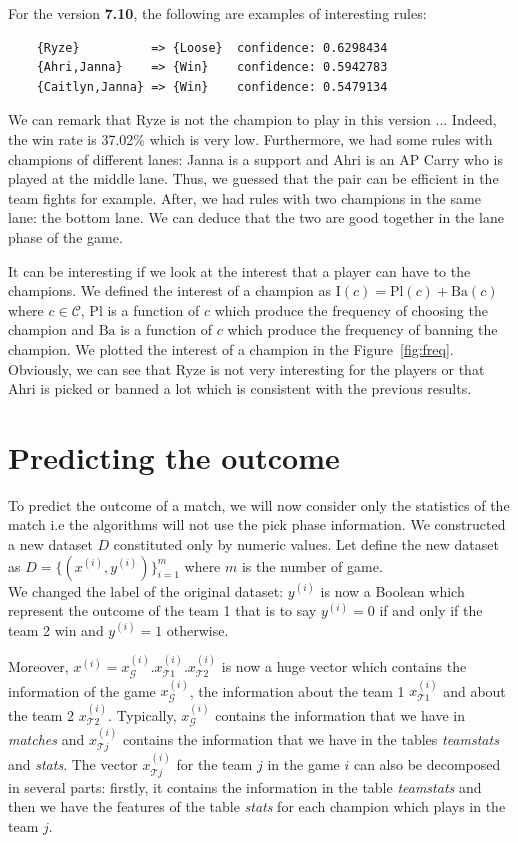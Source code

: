 \documentclass{article}
\def\version{\textbf{7.10}}
\def\champion{\mathcal{C}}
\def\interest#1{\text{I}(#1)}
\def\inTplay{\text{Pl}}
\def\inTban{\text{Ba}}
\def\database{D}
\begin{document}
For the version \version, the following are examples of interesting rules:
\begin{verbatim}
    {Ryze}          => {Loose}  confidence: 0.6298434
    {Ahri,Janna}    => {Win}    confidence: 0.5942783
    {Caitlyn,Janna} => {Win}    confidence: 0.5479134
\end{verbatim}
We can remark that Ryze is not the champion to play in this version ... Indeed, the win rate is 37.02\% which is very low.
Furthermore, we had some rules with champions of different lanes: Janna is a support and Ahri is an AP Carry who is played at the middle lane. Thus, we guessed that the pair can be efficient in the team fights for example. After, we had rules with two champions in the same lane: the bottom lane. We can deduce that the two are good together in the lane phase of the game.

It can be interesting if we look at the interest that a player can have to the champions. We defined the interest of a champion as $\interest{c}=\inTplay(c)+\inTban(c)$ where $c\in\champion$, $\inTplay$ is a function of $c$ which produce the frequency of choosing the champion and $\inTban$ is a function of $c$ which produce the frequency of banning the champion. We plotted the interest of a champion in the Figure~\ref{fig:freq}. Obviously, we can see that Ryze is not very interesting for the players or that Ahri is picked or banned a lot which is consistent with the previous results.

\section{Predicting the outcome}
To predict the outcome of a match, we will now consider only the statistics of the match i.e the algorithms will not use the pick phase information. We constructed a new dataset $\database$ constituted only by numeric values. Let define the new dataset as $\database=\{(x^{(i)}, y^{(i)})\}_{i=1}^{m}$ where $m$ is the number of game.\\ 
We changed the label of the original dataset: $y^{(i)}$ is now a Boolean which represent the outcome of the team 1 that is to say $y^{(i)}=0$ if and only if the team 2 win and $y^{(i)}=1$ otherwise.

Moreover, $x^{(i)}=x_{\mathcal{G}}^{(i)}.x_{\mathcal{T}1}^{(i)}.x_{\mathcal{T}2}^{(i)}$ is now a huge vector which contains the information of the game $x_{\mathcal{G}}^{(i)}$, the information about the team 1 $x_{\mathcal{T}1}^{(i)}$ and about the team 2 $x_{\mathcal{T}2}^{(i)}$. Typically, $x_{\mathcal{G}}^{(i)}$ contains the information that we have in \emph{matches} and $x_{\mathcal{T}j}^{(i)}$ contains the information that we have in the tables \emph{teamstats} and \emph{stats}. The vector $x_{\mathcal{T}j}^{(i)}$ for the team $j$ in the game $i$ can also be decomposed in several parts: firstly, it contains the information in the table \emph{teamstats} and then we have the features of the table \emph{stats} for each champion which plays in the team $j$.
\end{document}
